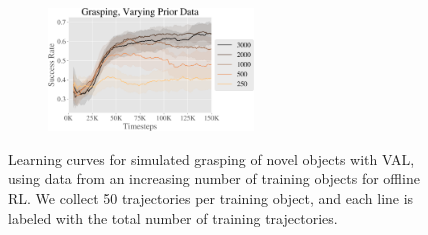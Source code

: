 \begin{figure}[t]
    \centering
    \begin{subfigure}[b]{0.99\linewidth}
        \center
        \includegraphics[width=0.6\textwidth]{val/imgs/object_data/vary_data-crop.pdf}
    \end{subfigure}

    \caption{Learning curves for simulated grasping of novel objects with VAL, using data from an increasing number of training objects for offline RL. We collect 50 trajectories per training object, and each line is labeled with the total number of training trajectories. }

    \label{fig:novel_obj}
    \vspace{-0.5cm}
\end{figure}